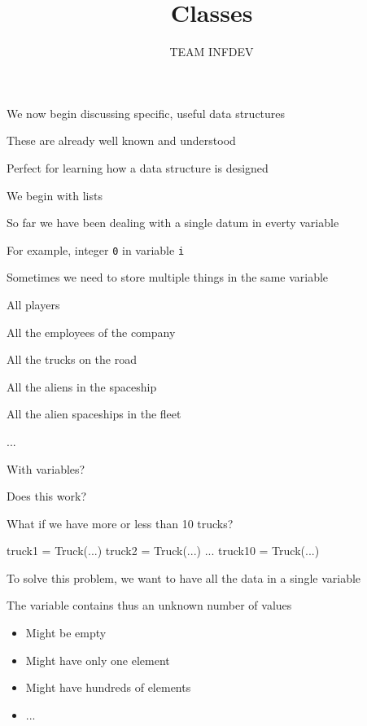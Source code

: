 \documentclass{beamer}
\title{Classes}
\author{TEAM INFDEV}
\institute{Hogeschool Rotterdam \\ 
Rotterdam, Netherlands}
\date{}
\begin{document}
\maketitle

\begin{slide}{
\item We now begin discussing specific, useful data structures
\item These are already well known and understood
\item Perfect for learning how a data structure is designed
\item We begin with lists
}\end{slide}

\begin{slide}{
\item So far we have been dealing with a single datum in everty variable
\item For example, integer \texttt{0} in variable \texttt{i}
\item Sometimes we need to store multiple things in the same variable
}\end{slide}

\begin{slide}{
\item All players
\item All the employees of the company
\item All the trucks on the road
\item All the aliens in the spaceship
\item All the alien spaceships in the fleet
\item ...
}\end{slide}

\begin{frame}[fragile]{With variables?}
\begin{codewithblock}{\pause \item Does this work? \item What if we have more or less than 10 trucks?}
truck1 = Truck(...)
truck2 = Truck(...)
...
truck10 = Truck(...)
\end{codewithblock}
\end{frame}

\begin{slide}{
\item To solve this problem, we want to have all the data in a single variable
\item The variable contains thus an unknown number of values
\begin{itemize}
\item Might be empty
\item Might have only one element
\item Might have hundreds of elements
\item ...
\end{itemize}
}\end{slide}
\end{document}
